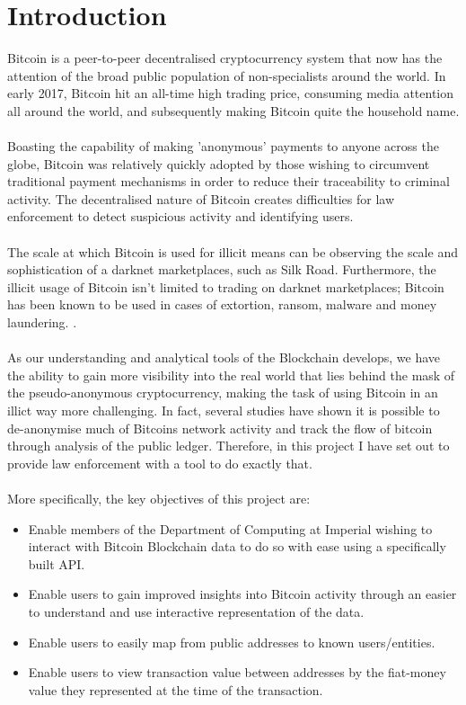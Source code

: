 \chapter{Introduction}

Bitcoin is a peer-to-peer decentralised cryptocurrency system that now has the attention of the broad public population of non-specialists around the world. In early 2017, Bitcoin hit an all-time high trading price, consuming media attention all around the world, and subsequently making Bitcoin quite the household name. 
\\\\
Boasting the capability of making 'anonymous' payments to anyone across the globe, Bitcoin was relatively quickly adopted by those wishing to circumvent traditional payment mechanisms in order to reduce their traceability to criminal activity. The decentralised nature of Bitcoin creates difficulties for law enforcement to detect suspicious activity and identifying users. 
\\\\
The scale at which Bitcoin is used for illicit means can be observing the scale and sophistication of a darknet marketplaces, such as Silk Road. Furthermore, the illicit usage of Bitcoin isn't limited to trading on darknet marketplaces; Bitcoin has been known to be used in cases of extortion, ransom, malware and money laundering.  \cite{RefWorks:doc:5c49e7c4e4b0d339f6625a91}. 
\\\\
As our understanding and analytical tools of the Blockchain develops, we have the ability to gain more visibility into the real world that lies behind the mask of the pseudo-anonymous cryptocurrency, making the task of using Bitcoin in an illict way more challenging. In fact, several studies have shown it is possible to de-anonymise much of Bitcoins network activity and track the flow of bitcoin through analysis of the public ledger. Therefore, in this project I have set out to provide law enforcement with a tool to do exactly that. 
\\\\
More specifically, the key objectives of this project are:
\begin{itemize}
    \item Enable members of the Department of Computing at Imperial wishing to interact with Bitcoin Blockchain data to do so with ease using a specifically built API. 
    \item Enable users to gain improved insights into Bitcoin activity through an easier to understand and use interactive representation of the data. 
    \item Enable users to easily map from public addresses to known users/entities. 
    \item Enable users to view transaction value between addresses by the \gls{fiat-money} value they represented at the time of the transaction. 
\end{itemize}

